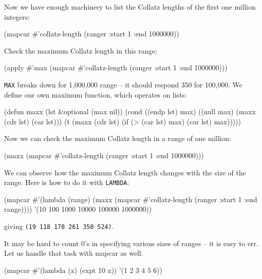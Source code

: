 \documentclass[a4paper,11pt]{article}
\begin{document}
\begin{uenum}
\begin{uenumi}
\item Now we have enough machinery to list the Collatz lengths of the first one million integers:

\begin{lispcode}
(mapcar #'collatz-length (ranger :start 1 :end 1000000))
\end{lispcode}

\item Check the maximum Collatz length in this range:

\begin{lispcode}
(apply #'max 
	(mapcar #'collatz-length (ranger :start 1 :end 1000000)))
\end{lispcode}

\item \Verb+MAX+ breaks down for 1,000,000 range -- it should respond 350 for 100,000. We define our own maximum function, which operates on lists:

\begin{lispcode}
(defun maxx (lst &optional (max nil))
  (cond ((endp lst) max)
		((null max) (maxx (cdr lst) (car lst)))
		(t (maxx (cdr lst) (if (> (car lst) max)
							 (car lst)
							 max)))))
\end{lispcode}

\item Now we can check the maximum Collatz length in a range of one million:

\begin{lispcode}
(maxx (mapcar #'collatz-length
              (ranger :start 1 :end 1000000))) 
\end{lispcode}

\item We can observe how the maximum Collatz length changes with the size of the range. Here is how to do it with \Verb+LAMBDA+: 

\begin{lispcode}
(mapcar 
	#'(lambda (range) 
		(maxx (mapcar #'collatz-length 
			(ranger :start 1 :end range)))) 
	'(10 100 1000 10000 100000 1000000))
\end{lispcode}
giving \Verb+(19 118 178 261 350 524)+.

\item It may be hard to count 0's in specifying various sizes of ranges -- it is easy to err. Let us handle that task with mapcar as well.

\begin{lispcode}
(mapcar #'(lambda (x) (expt 10 x)) '(1 2 3 4 5 6))
\end{lispcode}


\end{uenumi}
\end{uenum}
\end{document}
